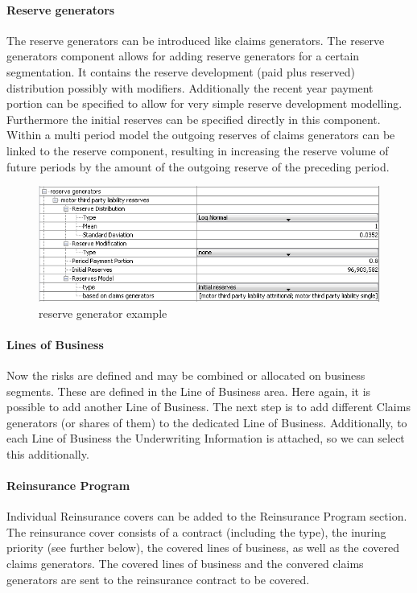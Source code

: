 \paragraph{Reserve generators}
The reserve generators can be introduced like claims generators. The reserve generators
component allows for adding reserve generators for a certain segmentation. It contains the
reserve development (paid plus reserved) distribution possibly with modifiers.
Additionally the recent year payment portion can be specified to allow for very simple
reserve development modelling. Furthermore the initial reserves can be specified directly in
this component.
Within a multi period model the outgoing reserves of claims generators can be linked to
the reserve component, resulting in increasing the reserve volume of future periods by the amount of the outgoing reserve of the preceding period. 

\begin{figure}
	\centering
		\includegraphics[scale=0.75]{images/podra-reservesgen.png}
	\caption{\PODRA{} reserve generator example}
	\label{fig:podra-reservegen}
\end{figure}

\paragraph{Lines of Business}
Now the risks are defined and may be combined or allocated on business segments. These are
defined in the Line of Business area. Here again, it is possible to add another Line of
Business. The next step is to add different Claims generators (or shares of them) to the
dedicated Line of Business. Additionally, to each Line of Business the Underwriting
Information is attached, so we can select this additionally.

\paragraph{Reinsurance Program}
Individual Reinsurance covers can be added to the Reinsurance Program section. The
reinsurance cover consists of a contract (including the type), the inuring priority (see further below), the
covered lines of business, as well as the covered claims generators. The covered lines of
business and the convered claims generators are sent to the reinsurance contract to be
covered.

